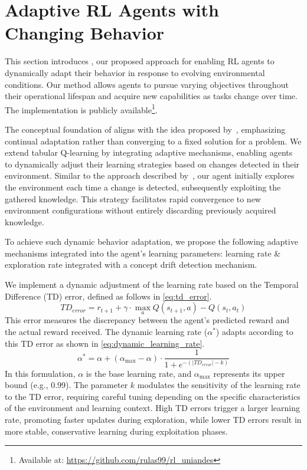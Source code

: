 
\section{Adaptive \ac{RL} Agents with Changing Behavior}
\label{sec:implementation}

This section introduces \adaptiverl, our proposed approach for enabling \ac{RL} agents to dynamically adapt their behavior in response to evolving environmental conditions. Our method allows agents to pursue varying objectives throughout their operational lifespan and acquire new capabilities as tasks change over time. The implementation is publicly available\footnote{Available at: \url{https://github.com/rulas99/rl_uniandes}}.

The conceptual foundation of \adaptiverl aligns with the idea proposed by~\citet{abel2023definitioncontinualreinforcementlearning}, emphasizing continual adaptation rather than converging to a fixed solution for a problem. We extend tabular Q-learning by integrating adaptive mechanisms, enabling agents to dynamically adjust their learning strategies based on changes detected in their environment. Similar to the approach described by~\citet{norman2024firstexploreexploitmetalearningsolve}, our agent initially explores the environment each time a change is detected, subsequently exploiting the gathered knowledge. This strategy facilitates rapid convergence to new environment configurations without entirely discarding previously acquired knowledge.

To achieve such dynamic behavior adaptation, we propose the following adaptive mechanisms integrated into the agent’s learning parameters: learning rate \& exploration rate integrated with a concept drift detection mechanism.

We implement a dynamic adjustment of the learning rate based on the Temporal Difference (TD) error, defined as follows in \eqref{eq:td_error}.
\begin{equation}
    \label{eq:td_error}
    TD_{error} = r_{t+1} + \gamma \cdot \underset{a}{\max} Q(s_{t+1}, a) - Q(s_t, a_t)
\end{equation}
This error measures the discrepancy between the agent’s predicted reward and the actual reward received. The dynamic learning rate ($\alpha^*$) adapts according to this TD error as shown in \eqref{eq:dynamic_learning_rate}.
\begin{equation}
    \label{eq:dynamic_learning_rate}
    \alpha^* = \alpha + (\alpha_{\max}-\alpha) \cdot \frac{1}{1 + e^{-(|TD_{error}|-k)}}
\end{equation}
In this formulation, $\alpha$ is the base learning rate, and $\alpha_{\max}$ represents its upper bound (e.g., 0.99). The parameter $k$ modulates the sensitivity of the learning rate to the TD error, requiring careful tuning depending on the specific characteristics of the environment and learning context. High TD errors trigger a larger learning rate, promoting faster updates during exploration, while lower TD errors result in more stable, conservative learning during exploitation phases.


